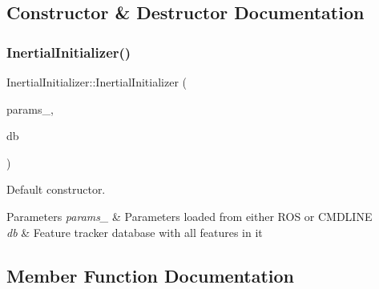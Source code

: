 \subsection{Constructor \& Destructor Documentation}
\mbox{\label{classov__init_1_1InertialInitializer_ab53c9effb332d8259cd04e06ab26ce5f}} 
\subsubsection{\texorpdfstring{Inertial\+Initializer()}{InertialInitializer()}}
{\footnotesize\ttfamily Inertial\+Initializer\+::\+Inertial\+Initializer (\begin{DoxyParamCaption}\item[{\hyperlink{structov__init_1_1InertialInitializerOptions}{Inertial\+Initializer\+Options} \&}]{params\+\_\+,  }\item[{std\+::shared\+\_\+ptr$<$ \hyperlink{classov__core_1_1FeatureDatabase}{ov\+\_\+core\+::\+Feature\+Database} $>$}]{db }\end{DoxyParamCaption})\hspace{0.3cm}{\ttfamily [explicit]}}



Default constructor. 


\begin{DoxyParams}{Parameters}
{\em params\+\_\+} & Parameters loaded from either R\+OS or C\+M\+D\+L\+I\+NE \\
\hline
{\em db} & Feature tracker database with all features in it \\
\hline
\end{DoxyParams}


\subsection{Member Function Documentation}
\mbox{\label{classov__init_1_1InertialInitializer_ac7f060d9cfedc4f780574ad436c34b66}} 
